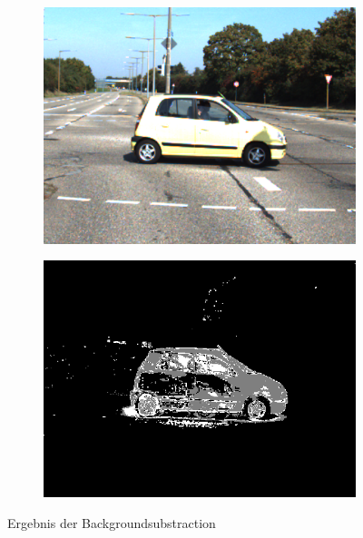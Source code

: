 \documentclass[conference]{IEEEtran}
\begin{document}
\begin{figure}
	\centering
	\begin{subfigure}[t]{0.23\textwidth}
		\includegraphics[width=\textwidth]{trainds01_original}
		\label{fig:sub2}
	\end{subfigure}
	\begin{subfigure}[t]{0.23\textwidth}
		\includegraphics[width=\textwidth]{trainds01_foregroundmask}
		\label{fig:sub1}
	\end{subfigure}	
	\caption{Ergebnis der Backgroundsubstraction}
	\label{fig:test}
\end{figure}
\end{document}
